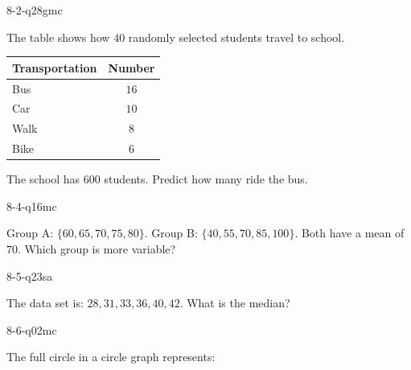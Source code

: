 \begin{practiceQuestion}{8-2-q28}{gmc}
\begin{questionText}
The table shows how $40$ randomly selected students travel to school.

\begin{center}
\begin{tabular}{|l|c|}
\hline
\textbf{Transportation} & \textbf{Number} \\
\hline
Bus & $16$ \\
\hline
Car & $10$ \\
\hline
Walk & $8$ \\
\hline
Bike & $6$ \\
\hline
\end{tabular}
\end{center}

The school has $600$ students. Predict how many ride the bus.
\end{questionText}
\end{practiceQuestion}

\begin{practiceQuestion}{8-4-q16}{mc}
\begin{questionText}
Group A: $\{60, 65, 70, 75, 80\}$. Group B: $\{40, 55, 70, 85, 100\}$. Both have a mean of $70$. Which group is more variable?
\end{questionText}
\end{practiceQuestion}

\begin{practiceQuestion}{8-5-q23}{sa}
\begin{questionText}
The data set is: $28, 31, 33, 36, 40, 42$. What is the median?
\end{questionText}
\end{practiceQuestion}

\begin{practiceQuestion}{8-6-q02}{mc}
\begin{questionText}
The full circle in a circle graph represents:
\end{questionText}
\end{practiceQuestion}

